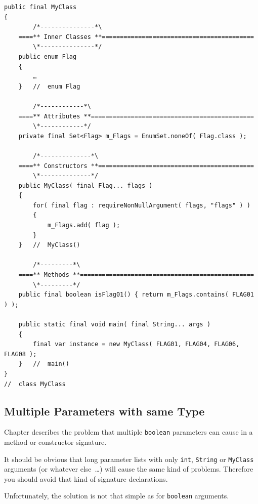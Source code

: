 \begin{lstlisting}
public final MyClass
{
        /*---------------*\
    ====** Inner Classes **==========================================
        \*---------------*/
    public enum Flag
    {
        …
    }   //  enum Flag    
   
        /*------------*\
    ====** Attributes **=============================================    
        \*------------*/
    private final Set<Flag> m_Flags = EnumSet.noneOf( Flag.class );
    
        /*--------------*\
    ====** Constructors **===========================================
        \*--------------*/
    public MyClass( final Flag... flags )
    {
        for( final flag : requireNonNullArgument( flags, "flags" ) )
        {
            m_Flags.add( flag );
        }
    }   //  MyClass()
    
        /*---------*\
    ====** Methods **================================================
        \*---------*/
    public final boolean isFlag01() { return m_Flags.contains( FLAG01 ) );
        
    public static final void main( final String... args )
    {
        final var instance = new MyClass( FLAG01, FLAG04, FLAG06, FLAG08 );
    }   //  main()
}
//  class MyClass
\end{lstlisting}


\subsection{Multiple Parameters with same Type}\label{sec:MultipleSameTypeArgs}
Chapter  describes the problem that multiple \lstinline|boolean| parameters can cause in a method or constructor signature.

It should be obvious that long parameter lists with only \lstinline|int|, \lstinline|String| or \lstinline|MyClass| arguments (or whatever else~…) will cause the same kind of problems. Therefore you should avoid that kind of signature declarations.

Unfortunately, the solution is not that simple as for \lstinline|boolean| arguments.


